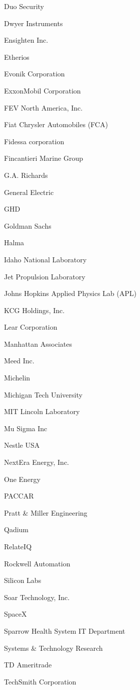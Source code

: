 \documentclass[twoside]{article}
\begin{document}
\begin{center}
\begin{multicols}{5}
\begin{FlushLeft}
\begin{compactitem}
\item Duo Security
\item Dwyer Instruments
\item Ensighten Inc.
\item Etherios
\item Evonik Corporation
\item ExxonMobil Corporation
\item FEV North America, Inc.
\item Fiat Chrysler Automobiles (FCA)
\item Fidessa corporation
\item Fincantieri Marine Group
\item G.A. Richards
\item General Electric
\item GHD
\item Goldman Sachs
\item Halma
\item Idaho National Laboratory
\item Jet Propulsion Laboratory
\item Johns Hopkins Applied Physics Lab (APL)
\item KCG Holdings, Inc.
\item Lear Corporation
\item Manhattan Associates
\item Meed Inc.
\item Michelin
\item Michigan Tech University
\item MIT Lincoln Laboratory
\item Mu Sigma Inc
\item Nestle USA
\item NextEra Energy, Inc.
\item One Energy
\item PACCAR
\item Pratt \& Miller Engineering
\item Qadium
\item RelateIQ
\item Rockwell Automation
\item Silicon Labs
\item Soar Technology, Inc.
\item SpaceX
\item Sparrow Health System IT Department
\item Systems \& Technology Research
\item TD Ameritrade
\item TechSmith Corporation

\end{compactitem}
\end{FlushLeft}
\end{multicols}
\end{center}
\end{document}

